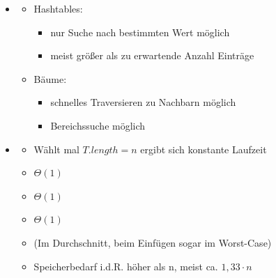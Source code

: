 \documentclass[
    12pt,
    a4paper,
    ngerman,
    color=3b,%
    marginpar=false,
    colorback=false,
    leqno,
]{tudaexercise}
\begin{document}
\begin{itemize}
        \item {}
            \begin{itemize}
                \item Hashtables:
                    \begin{itemize}
                        \item nur Suche nach bestimmten Wert möglich
                        \item meist größer als zu erwartende Anzahl Einträge
                    \end{itemize}
                \item Bäume:
                    \begin{itemize}
                        \item schnelles Traversieren zu Nachbarn möglich
                        \item Bereichssuche möglich
                    \end{itemize}
            \end{itemize}
        
        \item {}
            \begin{itemize}
                \item Wählt mal $T.length = n$ ergibt sich konstante Laufzeit
                \item {} $\Theta(1)$
                \item {} $\Theta(1)$
                \item {} $\Theta(1)$
                \item (Im Durchschnitt, beim Einfügen sogar im Worst-Case)
                \item Speicherbedarf i.d.R. höher als n, meist ca. $1,33 \cdot n$
            \end{itemize}
    \end{itemize}
\end{document}
